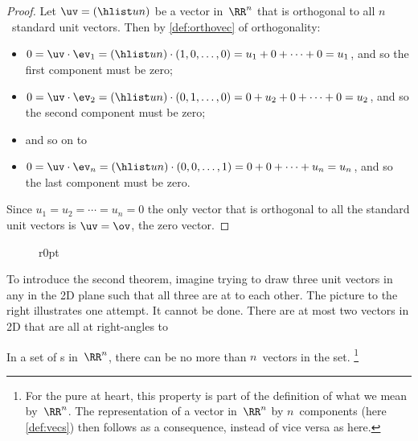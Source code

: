 \begin{proof} 
Let \(\uv=(\hlist un)\) be a vector in~\(\RR^n\) that is orthogonal to all \(n\)~standard unit vectors.  
Then by \cref{def:orthovec} of orthogonality:
\begin{itemize}
\item \(0=\uv\cdot\ev_1=(\hlist un)\cdot(1,0,\ldots,0)=u_1+0+\cdots+0=u_1\), and so the first component must be zero;
\item \(0=\uv\cdot\ev_2=(\hlist un)\cdot(0,1,\ldots,0)=0+u_2+0+\cdots+0=u_2\), and so the second component must be zero; 
\item and so on to
\item \(0=\uv\cdot\ev_n=(\hlist un)\cdot(0,0,\ldots,1)=0+0+\cdots+u_n=u_n\), and so the last component must be zero.
\end{itemize}
Since \(u_1=u_2=\cdots=u_n=0\) the only vector that is orthogonal to all the standard unit vectors is \(\uv=\ov\), the zero vector.
\end{proof}

\begin{figure}r{0pt}
\end{figure}
To introduce the second theorem, imagine trying to draw three unit vectors in any  in the 2D plane such that all three are at  to each other.
The picture to the right illustrates one attempt.
It cannot be done.
There are at most two vectors in 2D that are all at right-angles to 


\begin{theorem} \label{thm:orthcomp}
In a set of  s in~\(\RR^n\), there can be no more than \(n\)~vectors in the set.
\footnote{For the pure at heart, this property is part of the definition of what we mean by~\(\RR^n\).  
The representation of a vector in~\(\RR^n\) by \(n\)~components (here \cref{def:vecs}) then follows as a consequence, instead of vice versa as here.}
\end{theorem}

